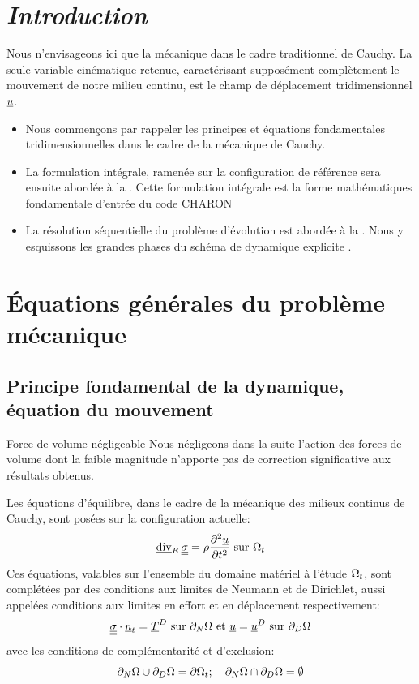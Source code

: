 \documentclass[10pt]{book}
\begin{document}
\section*{\emph{Introduction}}
Nous n'envisageons ici que la mécanique dans le cadre traditionnel de Cauchy. La seule variable cinématique retenue, caractérisant supposément complètement le mouvement de notre milieu continu, est le champ de déplacement tridimensionnel $\underline{u}$.
\begin{itemize}
\item Nous commençons  par rappeler les principes et équations fondamentales tridimensionnelles dans le cadre de la mécanique de Cauchy.
\item La formulation intégrale, ramenée sur la configuration de référence sera ensuite abordée à la . Cette formulation intégrale est la forme mathématiques fondamentale d'entrée du code CHARON
\item La résolution séquentielle du problème d'évolution est abordée à la . Nous y esquissons les grandes phases du schéma de \og dynamique explicite \fg{}.
\end{itemize}
\section{Équations générales du problème mécanique}\label{Section:Équations générales du problème mécanique}
\subsection{Principe fondamental de la dynamique, équation du mouvement}
\begin{Hypothese}{Force de volume négligeable} Nous négligeons dans la suite l'action des forces de volume dont la faible magnitude n'apporte pas de correction significative aux résultats obtenus.
\end{Hypothese}
Les équations d'équilibre, dans le cadre de la mécanique des milieux continus de Cauchy, sont posées sur la configuration actuelle:
\begin{equation}
\begin{aligned}
\vdiv_{E}\SC=\rho\dfrac{\partial^{2} \Dep}{\partial t^{2}} \sur \Configuration_{t}
\end{aligned}
\label{eq:equilibre}
\end{equation}
Ces équations, valables sur l'ensemble du domaine matériel à l'étude $\Omega_{t}$, sont complétées par des conditions aux limites de Neumann et de Dirichlet, aussi appelées \og conditions aux limites en effort et en déplacement \fg{} respectivement:
$$\underline{\underline{\sigma}}\cdot\underline{n}_{t}=\underline{T}^{D} \text{ sur } \partial_N\Omega \text{ et } \underline{u}=\underline{u}^{D} \text{ sur } \partial_D\Omega$$
avec les conditions de complémentarité et d'exclusion:
$$ \partial_N\Omega \cup \partial_D\Omega = \partial\Omega_{t}; \quad \partial_N\Omega \cap \partial_D\Omega = \emptyset$$
\end{document}
